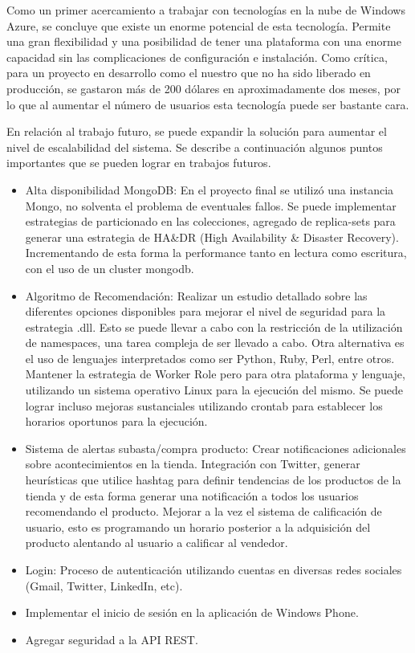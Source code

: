 \documentclass[journal]{IEEEtran}
\begin{document}
Como un primer acercamiento a trabajar con tecnologías en la nube de Windows Azure, se concluye que existe un enorme potencial de esta tecnología. Permite una gran flexibilidad y una posibilidad de tener una plataforma con una enorme capacidad sin las complicaciones de configuración e instalación. Como crítica, para un proyecto en desarrollo como el nuestro que no ha sido liberado en producción, se gastaron más de 200 dólares en aproximadamente dos meses, por lo que al aumentar el número de usuarios esta tecnología puede ser bastante cara.

En relación al trabajo futuro, se puede expandir la solución para aumentar el nivel de escalabilidad del sistema. Se describe a continuación algunos puntos importantes que se pueden lograr en trabajos futuros.

\begin{itemize}
  \item Alta disponibilidad MongoDB: En el proyecto final se utilizó una instancia Mongo, no solventa el problema de eventuales fallos. Se puede implementar estrategias de particionado en las colecciones, agregado de replica-sets para generar una estrategia de HA\&DR (High Availability \& Disaster Recovery). Incrementando de esta forma la performance tanto en lectura como escritura, con el uso de un cluster mongodb.
  \item Algoritmo de Recomendación: Realizar un estudio detallado sobre las diferentes opciones disponibles para mejorar el nivel de seguridad para la estrategia .dll. Esto se puede llevar a cabo con la restricción de la utilización de namespaces, una tarea compleja de ser llevado a cabo. Otra alternativa es el uso de lenguajes interpretados como ser Python, Ruby, Perl, entre otros. Mantener la estrategia de Worker Role pero para otra plataforma y lenguaje, utilizando un sistema operativo Linux para la ejecución del mismo. Se puede lograr incluso mejoras sustanciales utilizando crontab para establecer los horarios oportunos para la ejecución.
  \item Sistema de alertas subasta/compra producto: Crear notificaciones adicionales sobre acontecimientos en la tienda. Integración con Twitter, generar heurísticas que utilice hashtag para definir tendencias de los productos de la tienda y de esta forma generar una notificación a todos los usuarios recomendando el producto. Mejorar a la vez el sistema de calificación de usuario, esto es programando un horario posterior a la adquisición del producto alentando al usuario a calificar al vendedor.
  \item Login: Proceso de autenticación utilizando cuentas en diversas redes sociales (Gmail, Twitter, LinkedIn, etc).
  \item Implementar el inicio de sesión en la aplicación de Windows Phone. 
  \item Agregar seguridad a la API REST.
\end{itemize}



\end{document}
